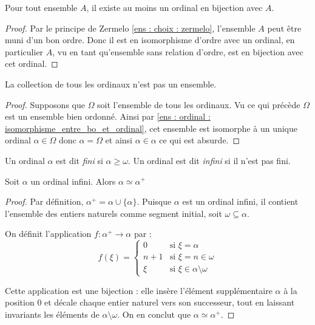\begin{corollaire}\label{ens : ordinal : existence_ordinal_équipotent}
Pour tout ensemble $A$, il existe au moins un ordinal en bijection avec $A$.
\end{corollaire}
\begin{proof}
    Par le principe de Zermelo \ref{ens : choix : zermelo}, l'ensemble $A$ peut être muni d'un bon ordre. Donc il est en isomorphisme d'ordre avec un ordinal, en particulier $A$, vu en tant qu'ensemble sans relation d'ordre, est en bijection avec cet ordinal.
\end{proof}

\begin{theoreme}
    La collection de tous les ordinaux n'est pas un ensemble.
\end{theoreme}

\begin{proof}
    Supposons que $\Omega$ soit l'ensemble de tous les ordinaux. Vu ce qui précède $\Omega$ est un ensemble bien ordonné. Ainsi par \ref{ens : ordinal : isomorphisme_entre_bo_et_ordinal}, cet ensemble est isomorphe à un unique ordinal $\alpha\in \Omega$ donc $\alpha=\Omega$ et ainsi $\alpha\in \alpha$ ce qui est absurde.
\end{proof}


\begin{definition}
    Un ordinal $\alpha$ est dit \emph{fini} si $\alpha\ge\omega$. Un ordinal est dit \emph{infini} si il n'est pas fini.
\end{definition}
\begin{proposition}
    Soit $\alpha$ un ordinal infini. Alors $\alpha\simeq \alpha^+$
\end{proposition}
\begin{proof}
Par définition, $\alpha^+ = \alpha \cup \{\alpha\}$. Puisque $\alpha$ est un ordinal infini, il contient l'ensemble des entiers naturels comme segment initial, soit $\omega \subseteq \alpha$. 

On définit l'application $f : \alpha^+ \to \alpha$ par :
\[
f(\xi) = 
\begin{cases} 
0 & \text{si } \xi = \alpha \\
n+1 & \text{si } \xi = n \in \omega \\
\xi & \text{si } \xi \in \alpha \setminus \omega
\end{cases}
\]

Cette application est une bijection : elle insère l'élément supplémentaire $\alpha$ à la position $0$ et décale chaque entier naturel vers son successeur, tout en laissant invariants les éléments de $\alpha \setminus \omega$. On en conclut que $\alpha \simeq \alpha^+$.
\end{proof}

